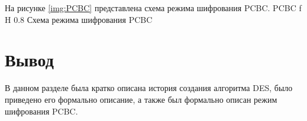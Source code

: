 На рисунке \ref{img:PCBC} представлена схема режима шифрования PCBC.
{PCBC} %
{f} %
{H} %
{0.8\textwidth} %
{Схема режима шифрования PCBC} %

\section*{Вывод}

В данном разделе была кратко описана история создания алгоритма DES, было приведено его формально описание, а также был формально описан режим шифрования PCBC.